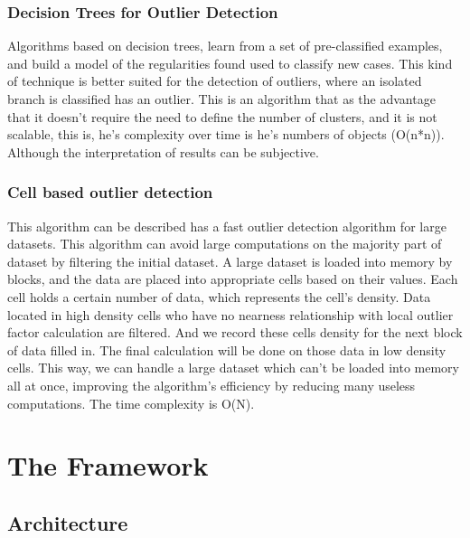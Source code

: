 \documentclass{llncs}
\begin{document}
\subsubsection{Decision Trees for Outlier Detection}
Algorithms based on decision trees, learn from a set of pre-classified examples, and build a model of the regularities found used to classify new cases.
This kind of technique is better suited for the detection of outliers, where an isolated branch is classified has an outlier.
This is an algorithm that as the advantage that it doesn't require the need to define the number of clusters, and it is not scalable, this is, he's complexity over time is he's numbers of objects (O(n*n)). Although the interpretation of results can be subjective.

\subsubsection{Cell based outlier detection}
This algorithm can be described has a fast outlier detection algorithm for large datasets. This algorithm can avoid large computations on the majority part of dataset by filtering the initial dataset.
A large dataset is loaded into memory by blocks, and the data are placed into appropriate cells based on their values. Each cell holds a certain number of data, which represents the cell's density. Data located in high density cells who have no nearness relationship with local outlier factor calculation are filtered. And we record these cells density for the next block of data filled in. The final calculation will be done on those data in low density cells. This way, we can handle a large dataset which can't be loaded into memory all at once, improving the algorithm's efficiency by reducing many useless computations. The time complexity is O(N).


\section{The Framework}

\subsection{Architecture}
\end{document}
